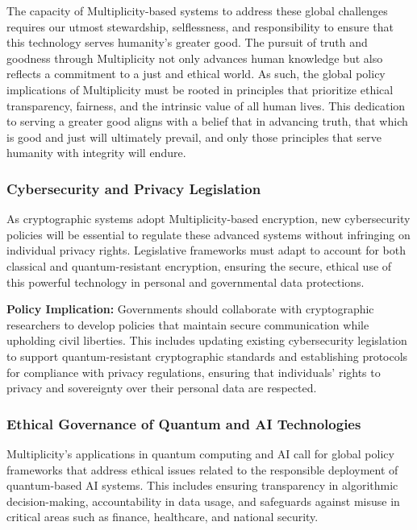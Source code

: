 \documentclass{article}
\theoremstyle{plain}
\begin{document}
The capacity of Multiplicity-based systems to address these global challenges requires our utmost stewardship, selflessness, and responsibility to ensure that this technology serves humanity’s greater good. The pursuit of truth and goodness through Multiplicity not only advances human knowledge but also reflects a commitment to a just and ethical world. As such, the global policy implications of Multiplicity must be rooted in principles that prioritize ethical transparency, fairness, and the intrinsic value of all human lives. This dedication to serving a greater good aligns with a belief that in advancing truth, that which is good and just will ultimately prevail, and only those principles that serve humanity with integrity will endure.

\subsubsection{Cybersecurity and Privacy Legislation}

As cryptographic systems adopt Multiplicity-based encryption, new cybersecurity policies will be essential to regulate these advanced systems without infringing on individual privacy rights. Legislative frameworks must adapt to account for both classical and quantum-resistant encryption, ensuring the secure, ethical use of this powerful technology in personal and governmental data protections.

\textbf{Policy Implication:} Governments should collaborate with cryptographic researchers to develop policies that maintain secure communication while upholding civil liberties. This includes updating existing cybersecurity legislation to support quantum-resistant cryptographic standards and establishing protocols for compliance with privacy regulations, ensuring that individuals’ rights to privacy and sovereignty over their personal data are respected.

\subsubsection{Ethical Governance of Quantum and AI Technologies}

Multiplicity’s applications in quantum computing and AI call for global policy frameworks that address ethical issues related to the responsible deployment of quantum-based AI systems. This includes ensuring transparency in algorithmic decision-making, accountability in data usage, and safeguards against misuse in critical areas such as finance, healthcare, and national security.
\end{document}
